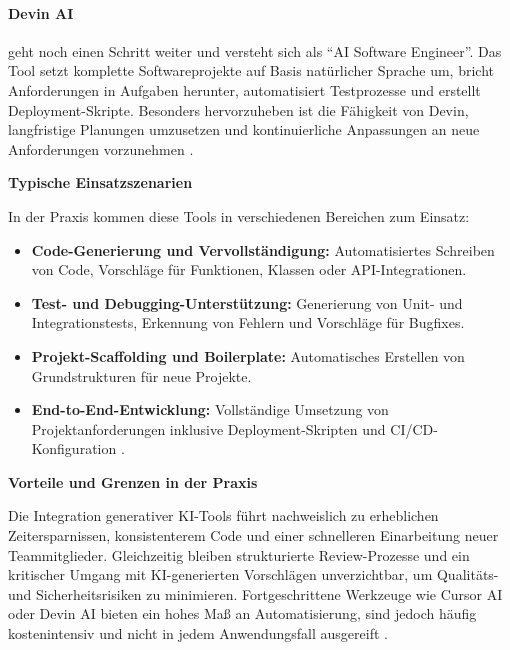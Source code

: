\paragraph{Devin AI}
geht noch einen Schritt weiter und versteht sich als \enquote{AI Software
    Engineer}. Das Tool setzt komplette Softwareprojekte auf Basis natürlicher
Sprache um, bricht Anforderungen in Aufgaben herunter, automatisiert
Testprozesse und erstellt Deployment-Skripte. Besonders hervorzuheben ist die
Fähigkeit von Devin, langfristige Planungen umzusetzen und kontinuierliche
Anpassungen an neue Anforderungen vorzunehmen \cite{donvir_role_2024}.

\vspace{1em}
\noindent
\textbf{Typische Einsatzszenarien}

In der Praxis kommen diese Tools in verschiedenen Bereichen zum Einsatz:
\begin{itemize}
    \item \textbf{Code-Generierung und Vervollständigung:} Automatisiertes Schreiben von Code, Vorschläge für Funktionen, Klassen oder API-Integrationen.
    \item \textbf{Test- und Debugging-Unterstützung:} Generierung von Unit- und Integrationstests, Erkennung von Fehlern und Vorschläge für Bugfixes.
    \item \textbf{Projekt-Scaffolding und Boilerplate:} Automatisches Erstellen von Grundstrukturen für neue Projekte.
    \item \textbf{End-to-End-Entwicklung:} Vollständige Umsetzung von Projektanforderungen inklusive Deployment-Skripten und CI/CD-Konfiguration \cite{donvir_role_2024}.
\end{itemize}

\vspace{1em}
\noindent
\textbf{Vorteile und Grenzen in der Praxis}

Die Integration generativer KI-Tools führt nachweislich zu erheblichen
Zeitersparnissen, konsistenterem Code und einer schnelleren Einarbeitung neuer
Teammitglieder. Gleichzeitig bleiben strukturierte Review-Prozesse und ein
kritischer Umgang mit KI-generierten Vorschlägen unverzichtbar, um Qualitäts-
und Sicherheitsrisiken zu minimieren. Fortgeschrittene Werkzeuge wie Cursor AI
oder Devin AI bieten ein hohes Maß an Automatisierung, sind jedoch häufig
kostenintensiv und nicht in jedem Anwendungsfall ausgereift
\cite{donvir_role_2024}.

